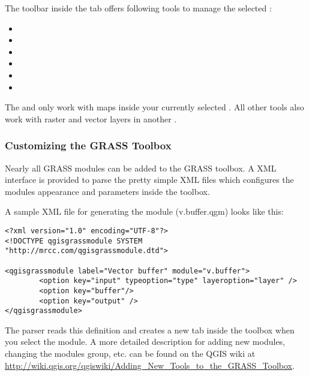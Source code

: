 The toolbar inside the  tab offers following tools to manage 
the selected :

\begin{itemize}
\item {}
\item {}
\item {}
\item {}
\item {}
\item {}
\end{itemize}

The  and 
 only work with maps inside 
your currently selected . All other tools also work with 
raster and vector layers in another .

\subsubsection{Customizing the GRASS Toolbox} 
\label{sec:toolbox-customizing}

Nearly all GRASS modules can be added to the GRASS toolbox. A XML 
interface is provided to parse the pretty simple XML files which configures 
the modules appearance and parameters inside the toolbox.

A sample XML file for generating the module  (v.buffer.qgm) 
looks like this:
\begin{verbatim}
<?xml version="1.0" encoding="UTF-8"?>
<!DOCTYPE qgisgrassmodule SYSTEM "http://mrcc.com/qgisgrassmodule.dtd">

<qgisgrassmodule label="Vector buffer" module="v.buffer">
        <option key="input" typeoption="type" layeroption="layer" />
        <option key="buffer"/>
        <option key="output" />
</qgisgrassmodule>
\end{verbatim}

The parser reads this definition and creates a new tab inside the toolbox 
when you select the module. A more detailed description for adding new 
modules, changing the modules group, etc. can be found on the QGIS wiki at \\
\url{http://wiki.qgis.org/qgiswiki/Adding\_New\_Tools\_to\_the\_GRASS\_Toolbox}.

